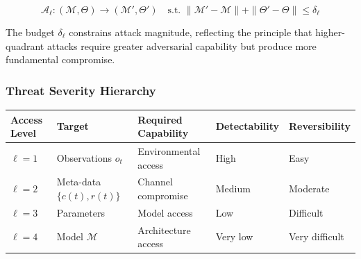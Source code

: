 \documentclass[
]{article}
\newcounter{none} %
\begin{document}
\begin{equation}
\mathcal{A}_\ell: (\mathcal{M}, \Theta) \rightarrow (\mathcal{M}', \Theta') \quad \text{s.t. } \|\mathcal{M}' - \mathcal{M}\| + \|\Theta' - \Theta\| \leq \delta_\ell
\label{eq:threat_model}
\end{equation}

The budget \(\delta_\ell\) constrains attack magnitude, reflecting the
principle that higher-quadrant attacks require greater adversarial
capability but produce more fundamental compromise.

\subsubsection{Threat Severity
Hierarchy}\label{threat-severity-hierarchy}

{\def\LTcaptype{none} %
\begin{longtable}[]{@{}
  >{\centering\arraybackslash}p{}
  >{\raggedright\arraybackslash}p{}
  >{\raggedright\arraybackslash}p{}
  >{\centering\arraybackslash}p{}
  >{\centering\arraybackslash}p{}@{}}
\toprule\noalign{}
\begin{minipage}[b]{\linewidth}\centering
Access Level
\end{minipage} & \begin{minipage}[b]{\linewidth}\raggedright
Target
\end{minipage} & \begin{minipage}[b]{\linewidth}\raggedright
Required Capability
\end{minipage} & \begin{minipage}[b]{\linewidth}\centering
Detectability
\end{minipage} & \begin{minipage}[b]{\linewidth}\centering
Reversibility
\end{minipage} \\
\midrule\noalign{}
\endhead
\bottomrule\noalign{}
\endlastfoot
\(\ell = 1\) & Observations \(o_t\) & Environmental access & High &
Easy \\
\(\ell = 2\) & Meta-data \(\{c(t), r(t)\}\) & Channel compromise &
Medium & Moderate \\
\(\ell = 3\) & Parameters \(\Theta) & Model access & Low & Difficult \\
\(\ell = 4\) & Model \(\mathcal{M}\) & Architecture access & Very low &
Very difficult \\
\end{longtable}
}
\end{document}

